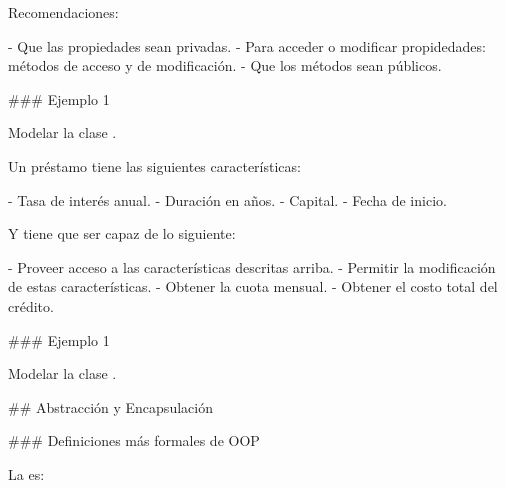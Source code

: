 Recomendaciones:

- Que las propiedades sean privadas.
    - Para acceder o modificar propidedades: métodos de acceso y de modificación.
- Que los métodos sean públicos.

### Ejemplo 1

Modelar la clase .\newline

Un préstamo tiene las siguientes características:

- Tasa de interés anual.
- Duración en años.
- Capital.
- Fecha de inicio.

Y tiene que ser capaz de lo siguiente:

- Proveer acceso a las características descritas arriba.
- Permitir la modificación de estas características.
- Obtener la cuota mensual.
- Obtener el costo total del crédito.

### Ejemplo 1

Modelar la clase .\newline

\centering{}

## Abstracción y Encapsulación

### Definiciones más formales de OOP

\newline

La  es:

